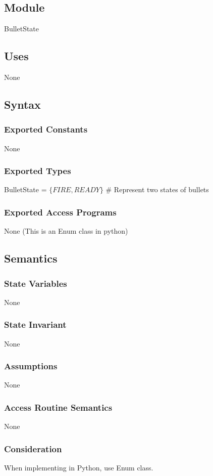 \documentclass[12pt]{article}
\begin{document}
\subsection*{Module}
BulletState

\subsection*{Uses}
None

\subsection*{Syntax}
\subsubsection*{Exported Constants}
None
\subsubsection*{Exported Types}
BulletState = $\{FIRE, READY\}$ \# Represent two states of bullets
\subsubsection*{Exported Access Programs}
None (This is an Enum class in python)

\subsection*{Semantics}
\subsubsection*{State Variables}
None
\subsubsection*{State Invariant}
None
\subsubsection*{Assumptions}
None
\subsubsection*{Access Routine Semantics}
None
\subsubsection*{Consideration}
When implementing in Python, use Enum class.
\newpage
\end{document}
